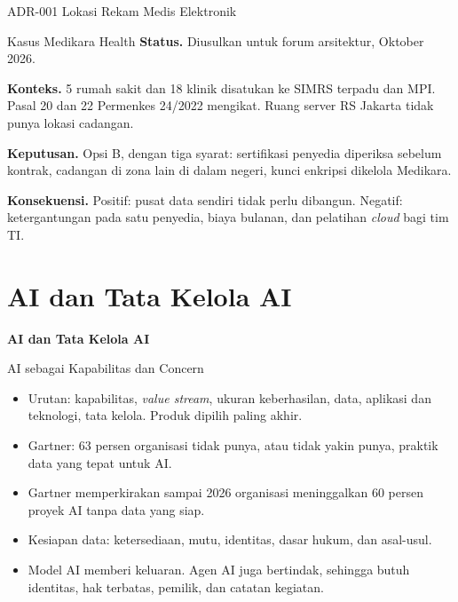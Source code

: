 \documentclass[aspectratio=169, table, 12pt]{beamer}
\begin{document}
\begin{frame}{{\Large ADR-001 Lokasi Rekam Medis Elektronik}}
  \begin{block}{Kasus Medikara Health}
    \footnotesize
    \textbf{Status.} Diusulkan untuk forum arsitektur, Oktober 2026.

    \textbf{Konteks.} 5 rumah sakit dan 18 klinik disatukan ke SIMRS terpadu dan MPI. Pasal 20 dan 22
    Permenkes 24/2022 mengikat. Ruang server RS Jakarta tidak punya lokasi cadangan.

    \textbf{Keputusan.} Opsi B, dengan tiga syarat: sertifikasi penyedia diperiksa sebelum kontrak,
    cadangan di zona lain di dalam negeri, kunci enkripsi dikelola Medikara.

    \textbf{Konsekuensi.} Positif: pusat data sendiri tidak perlu dibangun. Negatif: ketergantungan pada
    satu penyedia, biaya bulanan, dan pelatihan \textit{cloud} bagi tim TI.
  \end{block}
\end{frame}

\section{AI dan Tata Kelola AI}

\begin{frame}{\hfill}
  \centering
  \Huge{\textbf{AI dan Tata Kelola AI}}
\end{frame}

\begin{frame}{{\Large AI sebagai Kapabilitas dan Concern}}
  \small
  \vspace{4pt}
  \begin{itemize}
    \item Urutan: kapabilitas, \textit{value stream}, ukuran keberhasilan, data, aplikasi dan teknologi,
          tata kelola. Produk dipilih paling akhir.
    \item Gartner: 63 persen organisasi tidak punya, atau tidak yakin punya, praktik data yang tepat
          untuk AI.
    \item Gartner memperkirakan sampai 2026 organisasi meninggalkan 60 persen proyek AI tanpa data yang
          siap.
    \item Kesiapan data: ketersediaan, mutu, identitas, dasar hukum, dan asal-usul.
    \item Model AI memberi keluaran. Agen AI juga bertindak, sehingga butuh identitas, hak terbatas,
          pemilik, dan catatan kegiatan.
  \end{itemize}
\end{frame}
\end{document}
